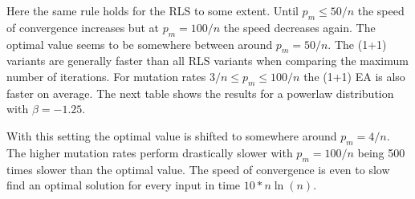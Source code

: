 Here the same rule holds for the RLS to some extent.
Until $p_m\le50/n$ the speed of convergence increases but at $p_m=100/n$ the speed decreases again.
The optimal value seems to be somewhere between around $p_m=50/n$.
The (1+1) variants are generally faster than all RLS variants when comparing the maximum number of iterations.
For mutation rates $3/n\le p_m \le 100/n$ the (1+1) EA is also faster on average.
The next table shows the results for a powerlaw distribution with $\beta=-1.25$.



With this setting the optimal value is shifted to somewhere around $p_m=4/n$.
The higher mutation rates perform drastically slower with $p_m=100/n$ being 500 times slower than the optimal value.
The speed of convergence is even to slow find an optimal solution for every input in time $10*n\ln(n)$.